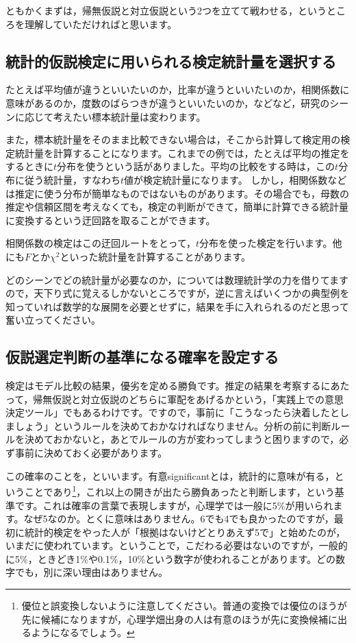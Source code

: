 \documentclass{ltjsbook}
\begin{document}
ともかくまずは，帰無仮説と対立仮説という2つを立てて戦わせる，というところを理解していただければと思います。

\subsection{統計的仮説検定に用いられる検定統計量を選択する}
たとえば平均値が違うといいたいのか，比率が違うといいたいのか，相関係数に意味があるのか，度数のばらつきが違うといいたいのか，などなど，研究のシーンに応じて考えたい標本統計量は変わります。

また，標本統計量をそのまま比較できない場合は，そこから計算して検定用の検定統計量を計算することになります。これまでの例では，たとえば平均の推定をするときに$t$分布を使うという話がありました。平均の比較をする時は，この$t$分布に従う統計量，すなわち$t$値が検定統計量になります。
しかし，相関係数などは推定に使う分布が簡単なものではないものがあります。その場合でも，母数の推定や信頼区間を考えなくても，検定の判断ができて，簡単に計算できる統計量に変換するという迂回路を取ることができます。

相関係数の検定はこの迂回ルートをとって，$t$分布を使った検定を行います。他にも$F$とか$\chi^2$といった統計量を計算することがあります。

どのシーンでどの統計量が必要なのか，については数理統計学の力を借りてますので，天下り式に覚えるしかないところですが，逆に言えばいくつかの典型例を知っていれば数学的な展開を必要とせずに，結果を手に入れられるのだと思って奮い立ってください。

\subsection{仮説選定判断の基準になる確率を設定する}
\label{sec:13_02b}
検定はモデル比較の結果，優劣を定める勝負です。推定の結果を考察するにあたって，帰無仮説と対立仮説のどちらに軍配をあげるかという，「実践上での意思決定ツール」でもあるわけです。ですので，事前に「こうなったら決着したとしましょう」というルールを決めておかなければなりません。分析の前に判断ルールを決めておかないと，あとでルールの方が変わってしまうと困りますので，必ず事前に決めておく必要があります。

この確率のことを，といいます。有意significantとは，統計的に意味が有る，ということであり\footnote{優位と誤変換しないように注意してください。普通の変換では優位のほうが先に候補になりますが，心理学畑出身の人は有意のほうが先に変換候補に出るようになるでしょう。}，これ以上の開きが出たら勝負あったと判断します，という基準です。これは確率の言葉で表現しますが，心理学では一般に5\%が用いられます。なぜ5なのか。とくに意味はありません。6でも4でも良かったのですが，最初に統計的検定をやった人が「根拠はないけどとりあえず5で」と始めたのが，いまだに使われています。ということで，こだわる必要はないのですが，一般的に5\%，ときどき1\%や0.1\%，10\%という数字が使われることがあります。どの数字でも，別に深い理由はありません。
\end{document}
